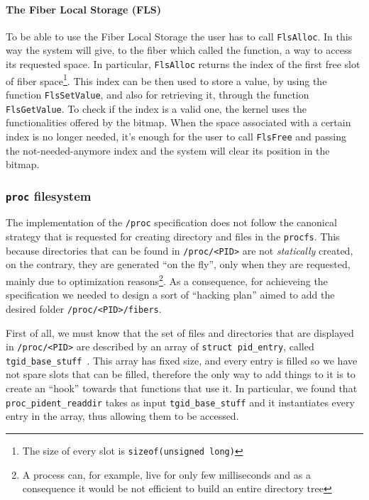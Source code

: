 \documentclass[a4paper,10pt]{article}
\begin{document}
  \paragraph{The Fiber Local Storage (FLS)}
    To be able to use the Fiber Local Storage the user has to call \lstinline{FlsAlloc}. In this way the system will give, to the fiber which called the function, a way to access its requested space. In particular, \lstinline{FlsAlloc} returns the index of the first free slot of fiber space\footnote{The size of every slot is \lstinline{sizeof(unsigned long)}}. This index can be then used to store a value, by using the function \lstinline{FlsSetValue}, and also for retrieving it, through the function \lstinline{FlsGetValue}. To check if the index is a valid one, the kernel uses the functionalities offered by the bitmap. When the space associated with a certain index is no longer needed, it’s enough for the user to call \lstinline{FlsFree} and passing the not-needed-anymore index and the system will clear its position in the bitmap.

\subsubsection{\texttt{\/proc} filesystem}\label{subsubsec:kern-procfs}
  The implementation of the \texttt{/proc} specification does not follow the canonical strategy that is requested for creating directory and files in the \texttt{procfs}. This because directories that can be found in \lstinline{/proc/<PID>} are not \textit{statically} created, on the contrary, they are generated ``on the fly'', only when they are requested, mainly due to optimization reasons\footnote{A process can, for example, live for only few milliseconds and as a consequence it would be not efficient to build an entire directory tree}. As a consequence, for achieveing the specification we needed to design a sort of ``hacking plan'' aimed to add the desired folder \lstinline{/proc/<PID>/fibers}.

  First of all, we must know that the set of files and directories that are displayed in \lstinline{/proc/<PID>} are described by an array of \lstinline{struct pid_entry}, called \lstinline{tgid_base_stuff}~\cite{kern_tgid_base_stuff}. This array has fixed size, and every entry is filled so we have not spare slots that can be filled, therefore the only way to add things to it is to create an ``hook'' towards that functions that use it. In particular, we found that \lstinline{proc_pident_readdir} takes as input \lstinline{tgid_base_stuff} and it instantiates every entry in the array, thus allowing them to be accessed.
\end{document}
